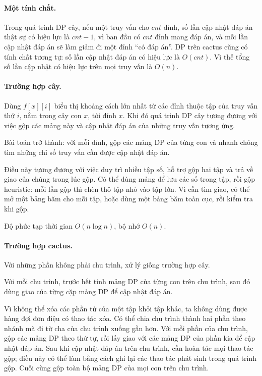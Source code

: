 \documentclass[11pt]{article}
\begin{document}
\paragraph{Một tính chất.}
Trong quá trình DP cây, nếu một truy vấn cho \(cnt\) đỉnh, số lần cập nhật đáp
án thật sự có hiệu lực là \(cnt-1\), vì ban đầu có \(cnt\) đỉnh mang đáp án, và
mỗi lần cập nhật đáp án sẽ làm giảm đi một đỉnh ``có đáp án''. DP trên cactus
cũng có tính chất tương tự: số lần cập nhật đáp án có hiệu lực là \(O(cnt)\).
Vì thế tổng số lần cập nhật có hiệu lực trên mọi truy vấn là \(O(n)\).

\paragraph{Trường hợp cây.}
Dùng \(f[x][i]\) biểu thị khoảng cách lớn nhất từ các đỉnh thuộc tập của truy
vấn thứ \(i\), nằm trong cây con \(x\), tới đỉnh \(x\). Khi đó quá trình DP cây
tương đương với việc gộp các mảng này và cập nhật đáp án của những truy vấn
tương ứng.

Bài toán trở thành: với mỗi đỉnh, gộp các mảng DP của từng con và nhanh chóng
tìm những chỉ số truy vấn cần được cập nhật đáp án.

Điều này tương đương với việc duy trì nhiều tập số, hỗ trợ gộp hai tập và trả
về giao của chúng trong lúc gộp. Có thể dùng mảng để lưu các số trong tập, rồi
gộp heuristic: mỗi lần gộp thì chèn thô tập nhỏ vào tập lớn. Vì cần tìm giao,
có thể mở một bảng băm cho mỗi tập, hoặc dùng một bảng băm toàn cục, rồi kiểm
tra khi gộp.

Độ phức tạp thời gian \(O(n\log n)\), bộ nhớ \(O(n)\).

\paragraph{Trường hợp cactus.}
Với những phần không phải chu trình, xử lý giống trường hợp cây.

Với mỗi chu trình, trước hết tính mảng DP của từng con trên chu trình, sau đó
dùng giao của từng cặp mảng DP để cập nhật đáp án.

Vì không thể xóa các phần tử của một tập khỏi tập khác, ta không dùng được hàng
đợi đơn điệu có thao tác xóa. Có thể chia chu trình thành hai phần theo nhánh
mà đi từ cha của chu trình xuống gần hơn. Với mỗi phần của chu trình, gộp các
mảng DP theo thứ tự, rồi lấy giao với các mảng DP của phần kia để cập nhật đáp
án. Sau khi cập nhật đáp án trên chu trình, cần hoàn tác mọi thao tác gộp; điều
này có thể làm bằng cách ghi lại các thao tác phát sinh trong quá trình gộp.
Cuối cùng gộp toàn bộ mảng DP của mọi con trên chu trình.
\end{document}
